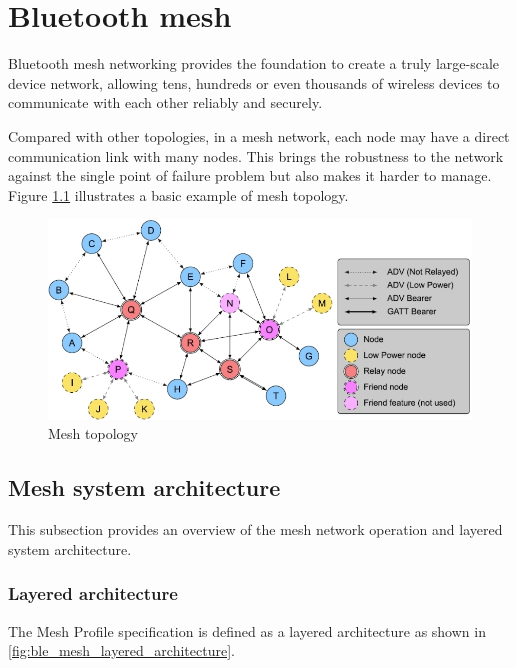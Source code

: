 \documentclass[\main/main.tex]{subfiles}
\begin{document}
\graphicspath{{img/}{ble_mesh/img/}}

\chapter{Bluetooth mesh}

Bluetooth mesh networking provides the foundation to create a truly large-scale device network, allowing tens, hundreds or even thousands of wireless devices to communicate with each other reliably and securely.

Compared with other topologies, in a mesh network, each node may have a direct communication link with many nodes. This brings the robustness to the network against the single point of failure problem but also makes it harder to manage. Figure \ref{fig:Mesh topology} illustrates a basic example of mesh topology.

\begin{figure}[H]
    \begin{center}
        \includegraphics[scale=0.7]{mesh_topology.jpg}
    \end{center}
    \caption{Mesh topology}
    \label{fig:Mesh topology}
\end{figure}


\section{Mesh system architecture}
This subsection provides an overview of the mesh network operation and layered system architecture.

\subsection{Layered architecture}

The Mesh Profile specification is defined as a layered architecture as shown in \ref{fig:ble_mesh_layered_architecture}.
\end{document}
